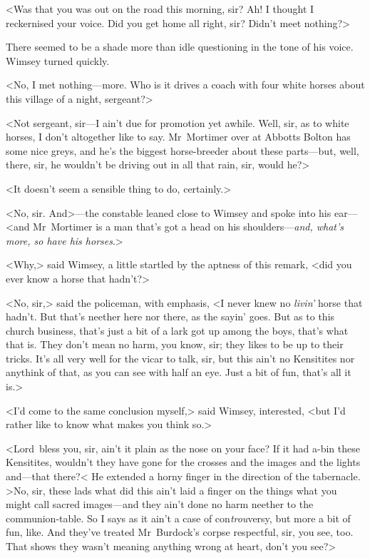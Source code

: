 <Was that you was out on the road this morning, sir? Ah! I thought I reckernised your voice. Did you get home all right, sir? Didn't meet nothing?>

There seemed to be a shade more than idle questioning in the tone of his voice. Wimsey turned quickly.

<No, I met nothing—more. Who is it drives a coach with four white horses about this village of a night, sergeant?>

<Not sergeant, sir—I ain't due for promotion yet awhile. Well, sir, as to white horses, I don't altogether like to say. Mr~Mortimer over at Abbotts Bolton has some nice greys, and he's the biggest horse-breeder about these parts—but, well, there, sir, he wouldn't be driving out in all that rain, sir, would he?>

<It doesn't seem a sensible thing to do, certainly.>

<No, sir. And>—the constable leaned close to Wimsey and spoke into his ear—<and Mr~Mortimer is a man that's got a head on his shoulders—\emph{and, what's more, so have his horses}.>

<Why,> said Wimsey, a little startled by the aptness of this remark, <did you ever know a horse that hadn't?>

<No, sir,> said the policeman, with emphasis, <I never knew no \emph{livin'} horse that hadn't. But that's neether here nor there, as the sayin' goes. But as to this church business, that's just a bit of a lark got up among the boys, that's what that is. They don't mean no harm, you know, sir; they likes to be up to their tricks. It's all very well for the vicar to talk, sir, but this ain't no Kensitites nor anythink of that, as you can see with half an eye. Just a bit of fun, that's all it is.>

<I'd come to the same conclusion myself,> said Wimsey, interested, <but I'd rather like to know what makes you think so.>

<Lord~bless you, sir, ain't it plain as the nose on your face? If it had a-bin these Kensitites, wouldn't they have gone for the crosses and the images and the lights and—that there?< He extended a horny finger in the direction of the tabernacle. >No, sir, these lads what did this ain't laid a finger on the things what you might call sacred images—and they ain't done no harm neether to the communion-table. So I says as it ain't a case of con\emph{trou}versy, but more a bit of fun, like. And they've treated Mr~Burdock's corpse respectful, sir, you see, too. That shows they wasn't meaning anything wrong at heart, don't you see?>

